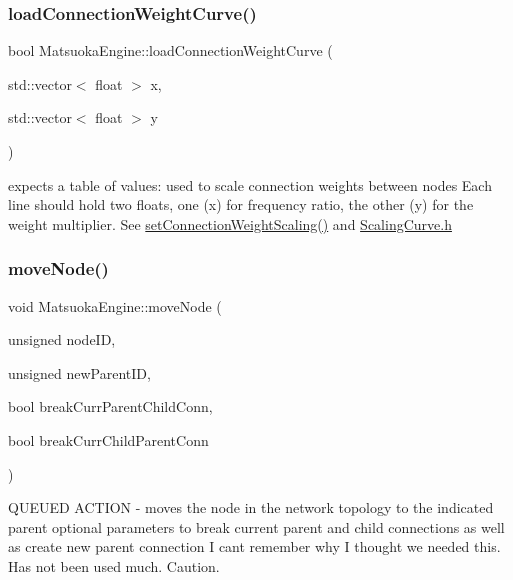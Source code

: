 \subsubsection{\texorpdfstring{load\+Connection\+Weight\+Curve()}{loadConnectionWeightCurve()}\hspace{0.1cm}{\footnotesize\ttfamily [2/2]}}
{\footnotesize\ttfamily bool Matsuoka\+Engine\+::load\+Connection\+Weight\+Curve (\begin{DoxyParamCaption}\item[{std\+::vector$<$ float $>$}]{x,  }\item[{std\+::vector$<$ float $>$}]{y }\end{DoxyParamCaption})}

expects a table of values\+: used to scale connection weights between nodes Each line should hold two floats, one (x) for frequency ratio, the other (y) for the weight multiplier. See \mbox{\hyperlink{classMatsuokaEngine_adb864bf26563682f94ba2e131fb8b793}{set\+Connection\+Weight\+Scaling()}} and \mbox{\hyperlink{ScalingCurve_8h}{Scaling\+Curve.\+h}} \mbox{\label{classMatsuokaEngine_abf37008845614f7b6a7ec0440141e06f}} 
\subsubsection{\texorpdfstring{move\+Node()}{moveNode()}}
{\footnotesize\ttfamily void Matsuoka\+Engine\+::move\+Node (\begin{DoxyParamCaption}\item[{unsigned}]{node\+ID,  }\item[{unsigned}]{new\+Parent\+ID,  }\item[{bool}]{break\+Curr\+Parent\+Child\+Conn,  }\item[{bool}]{break\+Curr\+Child\+Parent\+Conn }\end{DoxyParamCaption})}

Q\+U\+E\+U\+ED A\+C\+T\+I\+ON -\/ moves the node in the network topology to the indicated parent optional parameters to break current parent and child connections as well as create new parent connection I can\textquotesingle{}t remember why I thought we needed this. Has not been used much. Caution. \mbox{\label{classMatsuokaEngine_aac87afef0c7c99601fa77e2be27b2b74}} 
